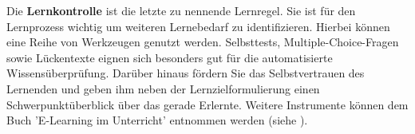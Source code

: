 Die \textbf{Lernkontrolle} ist die letzte zu nennende Lernregel. \cite[S. 15]{Vontobel.2006} Sie ist für den Lernprozess wichtig um weiteren Lernebedarf zu identifizieren. Hierbei können eine Reihe von Werkzeugen genutzt werden. Selbsttests, Multiple-Choice-Fragen sowie Lückentexte eignen sich besonders gut für die automatisierte Wissensüberprüfung. Darüber hinaus fördern Sie das Selbstvertrauen des Lernenden und geben ihm neben der Lernzielformulierung einen Schwerpunktüberblick über das gerade Erlernte. \cite[S. 72f.]{Drummer.2011} Weitere Instrumente können dem Buch 'E-Learning im Unterricht' entnommen werden (siehe \cite{Drummer.2011}).  

